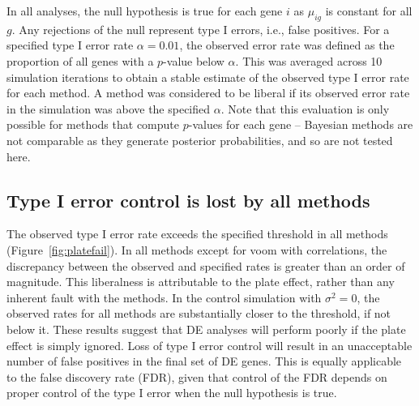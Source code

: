 \documentclass[oupdraft]{bio}
\begin{document}
In all analyses, the null hypothesis is true for each gene $i$ as $\mu_{ig}$ is constant for all $g$.
Any rejections of the null represent type I errors, i.e., false positives.
For a specified type I error rate $\alpha = 0.01$, the observed error rate was defined as the proportion of all genes with a $p$-value below $\alpha$.
This was averaged across 10 simulation iterations to obtain a stable estimate of the observed type I error rate for each method. 
A method was considered to be liberal if its observed error rate in the simulation was above the specified $\alpha$.
Note that this evaluation is only possible for methods that compute $p$-values for each gene -- 
    Bayesian methods \citep{kharchenko2014bayesian} are not comparable as they generate posterior probabilities, and so are not tested here.


\subsection{Type I error control is lost by all methods}
The observed type I error rate exceeds the specified threshold in all methods (Figure~\ref{fig:platefail}).
In all methods except for voom with correlations, the discrepancy between the observed and specified rates is greater than an order of magnitude.
This liberalness is attributable to the plate effect, rather than any inherent fault with the methods.
In the control simulation with $\sigma^2=0$, the observed rates for all methods are substantially closer to the threshold, if not below it.
These results suggest that DE analyses will perform poorly if the plate effect is simply ignored.
Loss of type I error control will result in an unacceptable number of false positives in the final set of DE genes.
This is equally applicable to the false discovery rate (FDR), given that control of the FDR depends on proper control of the type I error when the null hypothesis is true.
\end{document}
